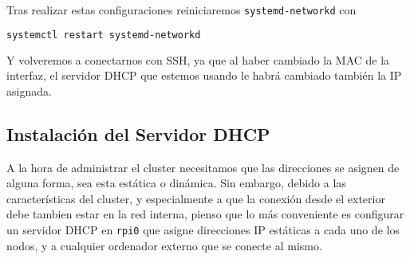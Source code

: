 Tras realizar estas configuraciones reiniciaremos \texttt{systemd-networkd} con
\begin{lstlisting}[language=bash]
systemctl restart systemd-networkd
\end{lstlisting}

Y volveremos a conectarnos con SSH, ya que al haber cambiado la MAC de la interfaz, el servidor DHCP que estemos usando le habrá cambiado también la IP asignada.

\subsection{Instalación del Servidor DHCP}
\label{ssec:instalacion_servidor_dhcp}
A la hora de administrar el cluster necesitamos que las direcciones se asignen de alguna forma, sea esta estática o dinámica. Sin embargo, debido a las características del cluster, y especialmente a que la conexión desde el exterior debe tambien estar en la red interna, pienso que lo más conveniente es configurar un servidor DHCP en \texttt{rpi0} que asigne direcciones IP estáticas a cada uno de los nodos, y a cualquier ordenador externo que se conecte al mismo.
